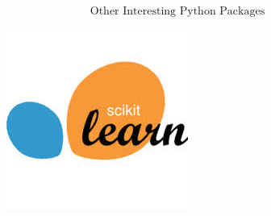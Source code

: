 \documentclass[MASTER.tex]{subfiles}
\begin{document}
 
	
	
\begin{frame}
	\huge
\[ \mbox{Other Interesting Python Packages} \]
\end{frame}




\begin{frame}
	\begin{figure}
\centering
\includegraphics[width=0.7\linewidth]{SKL-logo}

\end{figure}

\end{frame}
\end{document}
